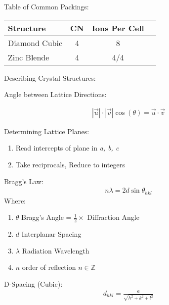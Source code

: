 \documentclass{article}
\begin{document}
\begin{multicols}{2}
Table of Common Packings:
\begin{center}
    \begin{tabular}{ l c c c }
        Structure        & CN & Ions Per Cell \\
        \hline
        Diamond Cubic    & 4  & 8 \\ 
        Zinc Blende      & 4  & 4/4 \\  
    \end{tabular}
\end{center}
Describing Crystal Structures:

Angle between Lattice Directions:

\begin{equation*}
    \begin{split}
        |\vec{u}|\cdot|\vec{v}|\cos(\theta) = \vec{u}\cdot\vec{v}
    \end{split}
\end{equation*}

Determining Lattice Planes:

\begin{enumerate}
    \setlength\itemsep{-0.5em}
    \item Read intercepts of plane in \textit{a, b, c}
    \item Take reciprocals, Reduce to integers
\end{enumerate}

Bragg's Law:
\begin{equation*}
    \begin{split}
        n\lambda = 2d\sin\theta_{hkl}
    \end{split}
\end{equation*}
Where:
\begin{enumerate}
    \setlength\itemsep{-0.5em}
    \item $\theta$ Bragg's Angle = $\frac{1}{2}\times$ Diffraction Angle
    \item $d$ Interplanar Spacing
    \item $\lambda$ Radiation Wavelength
    \item $n$ order of reflection $n \in \mathbb{Z}$
\end{enumerate}

D-Spacing (Cubic):
\begin{equation*}
    \begin{split}
        d_{hkl}=\frac{a}{\sqrt{h^2+k^2+l^2}}
    \end{split}
\end{equation*}


\end{multicols}
\end{document}
